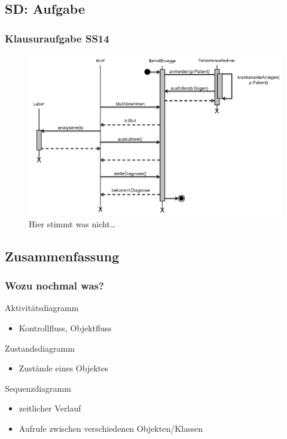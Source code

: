 \documentclass[18pt]{beamer}
\begin{document}
	\subsection{SD: Aufgabe}
	\begin{frame}
		\frametitle{Klausuraufgabe SS14}
			\begin{figure}
				\centering
				\includegraphics[scale=0.65]{./pics/tut2/sdtask.png}
				\caption{Hier stimmt was nicht\dots}
			\end{figure}
	\end{frame}

	\subsection{Zusammenfassung}
	\begin{frame}
		\frametitle{Wozu nochmal was?}
		\begin{block}{Aktivitätsdiagramm}
			\begin{itemize}
				\item Kontrollfluss, Objektfluss
			\end{itemize}
		\end{block}
	\pause
	\begin{block}{Zustandsdiagramm}
		\begin{itemize}
			\item Zustände eines Objektes
		\end{itemize}
	\end{block}
	\pause
	\begin{block}{Sequenzdiagramm}
		\begin{itemize}
			\item zeitlicher Verlauf
			\item Aufrufe zwischen verschiedenen Objekten/Klassen
		\end{itemize}
	\end{block}
\end{frame}
\end{document}
